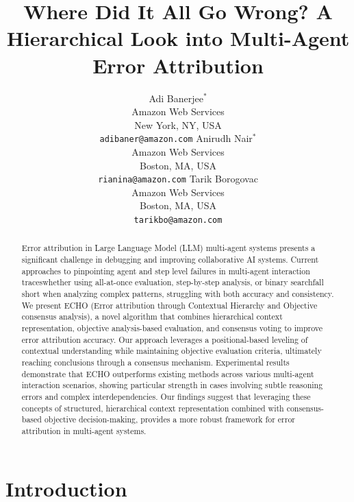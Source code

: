\documentclass{article}
\title{Where Did It All Go Wrong? A Hierarchical Look into Multi-Agent Error Attribution}
\author{
    Adi Banerjee$^*$ \\
    Amazon Web Services \\
    New York, NY, USA \\
    \texttt{adibaner@amazon.com} \And
    Anirudh Nair$^*$ \\
    Amazon Web Services \\
    Boston, MA, USA \\
    \texttt{rianina@amazon.com} \And
    Tarik Borogovac \\
    Amazon Web Services \\
    Boston, MA, USA \\
    \texttt{tarikbo@amazon.com}
}
\begin{document}
\maketitle
\def\thefootnote{*}\def\thefootnote{\arabic{footnote}}

\begin{abstract}
  Error attribution in Large Language Model (LLM) multi-agent systems presents a significant challenge in debugging and improving collaborative AI systems. Current approaches to pinpointing agent and step level failures in multi-agent interaction traces\textemdash whether using all-at-once evaluation, step-by-step analysis, or binary search\textemdash fall short when analyzing complex patterns, struggling with both accuracy and consistency. We present ECHO (Error attribution through Contextual Hierarchy and Objective consensus analysis), a novel algorithm that combines hierarchical context representation, objective analysis-based evaluation, and consensus voting to improve error attribution accuracy. Our approach leverages a positional-based leveling of contextual understanding while maintaining objective evaluation criteria, ultimately reaching conclusions through a consensus mechanism. Experimental results demonstrate that ECHO outperforms existing methods across various multi-agent interaction scenarios, showing particular strength in cases involving subtle reasoning errors and complex interdependencies. Our findings suggest that leveraging these concepts of structured, hierarchical context representation combined with consensus-based objective decision-making, provides a more robust framework for error attribution in multi-agent systems.


\end{abstract}


\section{Introduction}
\end{document}
